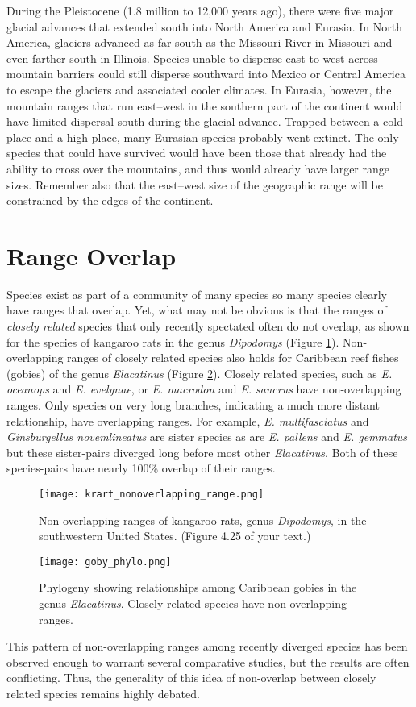 \documentclass[12pt, oneside]{article}   	%
\begin{document}
During the Pleistocene (1.8 million to 12,000 years ago), there were five major glacial advances that extended south into North America and Eurasia. In North America, glaciers advanced as far south as the Missouri River in Missouri and even farther south in Illinois.  Species unable to disperse east to west across mountain barriers could still disperse southward into Mexico or Central America to escape the glaciers and associated cooler climates.  In Eurasia, however, the mountain ranges that run east--west in the southern part of the continent would have limited dispersal south during the glacial advance.  Trapped between a cold place and a high place, many Eurasian species probably went extinct.  The only species that could have survived would have been those that already had the ability to cross over the mountains, and thus would already have larger range sizes. Remember also that the east--west size of the geographic range will be constrained by the edges of the continent.

\section{Range Overlap}

Species exist as part of a community of many species so many species clearly have ranges that overlap. Yet, what may not be obvious is that the ranges of \emph{closely related} species that only recently spectated often do not overlap, as shown for the species of kangaroo rats in the genus \emph{Dipodomys} (Figure \ref{krat range}).  Non-overlapping ranges of closely related species also holds for Caribbean reef fishes (gobies) of the genus \emph{Elacatinus} (Figure \ref{elacatinus}). Closely related species, such as \emph{E. oceanops} and \emph{E. evelynae}, or \emph{E. macrodon} and \emph{E. saucrus} have non-overlapping ranges.  Only species on very long branches, indicating a much more distant relationship, have overlapping ranges.  For example, \emph{E. multifasciatus} and \emph{Ginsburgellus novemlineatus} are sister species as are \emph{E. pallens} and \emph{E. gemmatus} but these sister-pairs diverged long before most other \emph{Elacatinus}. Both of these species-pairs have nearly 100\% overlap of their ranges.

\begin{figure}
	\centering
		\texttt{[image: krart\_nonoverlapping\_range.png]}  
		\caption{Non-overlapping ranges of kangaroo rats, genus \emph{Dipodomys}, in the southwestern United States. (Figure 4.25 of your text.)\label{krat range}}
\end{figure}

\begin{figure}
	\centering
		\texttt{[image: goby\_phylo.png]}  
		\caption{Phylogeny showing relationships among Caribbean gobies in the genus \emph{Elacatinus}. Closely related species have non-overlapping ranges.\label{elacatinus}}
\end{figure}

This pattern of non-overlapping ranges among recently diverged species has been observed enough to warrant several comparative studies, but the results are often conflicting.  Thus, the generality of this idea of non-overlap between closely related species remains highly debated.
\end{document}
